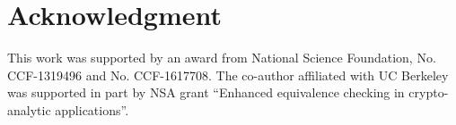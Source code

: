\documentclass[journal]{IEEEtran}
\begin{document}
\section*{Acknowledgment}
This work was supported by an award from National Science Foundation, No. CCF-1319496 and No. CCF-1617708. The co-author affiliated with UC Berkeley was supported in part by NSA grant ``Enhanced equivalence checking in
crypto-analytic applications''.





\end{document}
